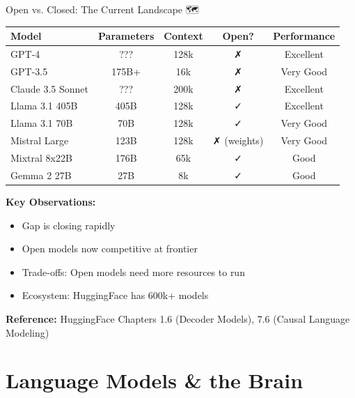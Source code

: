\documentclass[aspectratio=169]{beamer}
\begin{document}
\begin{frame}{Open vs. Closed: The Current Landscape 🗺️}
\begin{center}
\small
\begin{tabular}{lcccc}
\toprule
\textbf{Model} & \textbf{Parameters} & \textbf{Context} & \textbf{Open?} & \textbf{Performance} \\
\midrule
GPT-4 & ??? & 128k & ✗ & \alert{Excellent} \\
GPT-3.5 & 175B+ & 16k & ✗ & Very Good \\
Claude 3.5 Sonnet & ??? & 200k & ✗ & Excellent \\
\midrule
Llama 3.1 405B & 405B & 128k & ✓ & \alert{Excellent} \\
Llama 3.1 70B & 70B & 128k & ✓ & Very Good \\
Mistral Large & 123B & 128k & ✗ (weights) & Very Good \\
Mixtral 8x22B & 176B & 65k & ✓ & Good \\
Gemma 2 27B & 27B & 8k & ✓ & Good \\
\bottomrule
\end{tabular}
\end{center}

\vspace{1em}

\textbf{Key Observations:}
\begin{itemize}
    \item Gap is \alert{closing rapidly}
    \item Open models now competitive at frontier
    \item Trade-offs: Open models need more resources to run
    \item Ecosystem: HuggingFace has 600k+ models
\end{itemize}

\vspace{0.5em}

\textbf{Reference:} HuggingFace Chapters 1.6 (Decoder Models), 7.6 (Causal Language Modeling)
\end{frame}

\section{Language Models \& the Brain}
\end{document}
